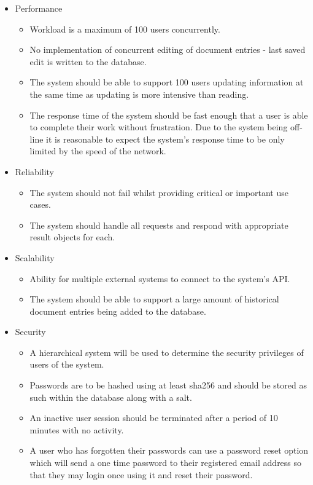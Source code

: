 \documentclass{article}
\begin{document}
		\begin{itemize}
			\item Performance
			\begin{itemize}
				\item Workload is a maximum of 100 users concurrently.
				\item No implementation of concurrent editing of document entries - last saved edit is written to the database.
				\item The system should be able to support 100 users updating information at the same time as updating is more intensive than reading.
				\item The response time of the system should be fast enough that a user is able to complete their work without frustration. Due to the system being off-line it is reasonable to expect the system's response time to be only limited by the speed of the network.
			\end{itemize}
			\item Reliability
			\begin{itemize}
				\item The system should not fail whilst providing critical or important use cases.
				\item The system should handle all requests and respond with appropriate result objects for each.
			\end{itemize}
			\item Scalability
			\begin{itemize}
				\item Ability for multiple external systems to connect to the system's API.
				\item The system should be able to support a large amount of historical document entries being added to the database.
			\end{itemize}
			\item Security
			\begin{itemize}
				\item A hierarchical system will be used to determine the security privileges of users of the system.
				\item Passwords are to be hashed using at least sha256 and should be stored as such within the database along with a salt.
				\item An inactive user session should be terminated after a period of 10 minutes with no activity.
				\item A user who has forgotten their passwords can use a password reset option which will send a one time password to their registered email address so that they may login once using it and reset their password.

\end{itemize}
\end{itemize}
\end{document}
